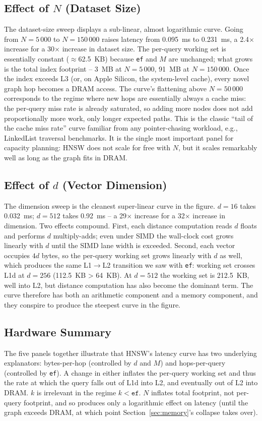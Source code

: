 \documentclass[conference]{IEEEtran}
\begin{document}
\subsection{Effect of $N$ (Dataset Size)}
The dataset-size sweep displays a sub-linear, almost logarithmic curve.
Going from $N=5\,000$ to $N=150\,000$ raises latency from 0.095~ms to
0.231~ms, a 2.4$\times$ increase for a 30$\times$ increase in dataset
size. The per-query working set is essentially constant ($\approx$62.5~KB)
because \texttt{ef} and $M$ are unchanged; what grows is the total index
footprint -- 3~MB at $N=5\,000$, 91~MB at $N=150\,000$. Once the index
exceeds L3 (or, on Apple Silicon, the system-level cache), every novel
graph hop becomes a DRAM access. The curve's flattening above
$N=50\,000$ corresponds to the regime where new hops are essentially
always a cache miss: the per-query miss rate is already saturated, so
adding more nodes does not add proportionally more work, only longer
expected paths. This is the classic ``tail of the cache miss rate'' curve
familiar from any pointer-chasing workload, e.g., LinkedList traversal
benchmarks. It is the single most important panel for capacity planning:
HNSW does not scale for free with $N$, but it scales remarkably well as
long as the graph fits in DRAM.

\subsection{Effect of $d$ (Vector Dimension)}
The dimension sweep is the cleanest super-linear curve in the figure.
$d=16$ takes 0.032~ms; $d=512$ takes 0.92~ms -- a 29$\times$ increase
for a 32$\times$ increase in dimension. Two effects compound. First, each
distance computation reads $d$ floats and performs $d$ multiply-adds; even
under SIMD the wall-clock cost grows linearly with $d$ until the SIMD lane
width is exceeded. Second, each vector occupies $4d$ bytes, so the
per-query working set grows linearly with $d$ as well, which produces the
same L1$\rightarrow$L2 transition we saw with \texttt{ef}: working set
crosses L1d at $d=256$ (112.5~KB > 64~KB). At $d=512$ the working set is
212.5~KB, well into L2, but distance computation has also become the
dominant term. The curve therefore has both an arithmetic component and a
memory component, and they conspire to produce the steepest curve in the
figure.

\subsection{Hardware Summary}
The five panels together illustrate that HNSW's latency curve has two
underlying explanators: bytes-per-hop (controlled by $d$ and $M$) and
hops-per-query (controlled by \texttt{ef}). A change in either inflates
the per-query working set and thus the rate at which the query falls out
of L1d into L2, and eventually out of L2 into DRAM. $k$ is irrelevant in
the regime $k < \texttt{ef}$. $N$ inflates total footprint, not per-query
footprint, and so produces only a logarithmic effect on latency (until
the graph exceeds DRAM, at which point Section~\ref{sec:memory}'s collapse
takes over).
\end{document}

